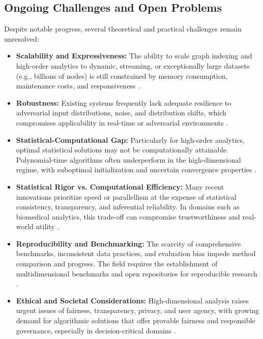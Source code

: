 \documentclass[sigconf]{acmart}
\begin{document}
\subsection{Ongoing Challenges and Open Problems}

Despite notable progress, several theoretical and practical challenges remain unresolved:

\begin{itemize}
    \item \textbf{Scalability and Expressiveness:} The ability to scale graph indexing and high-order analytics to dynamic, streaming, or exceptionally large datasets (e.g., billions of nodes) is still constrained by memory consumption, maintenance costs, and responsiveness \cite{ref104,ref107}.
    \item \textbf{Robustness:} Existing systems frequently lack adequate resilience to adversarial input distributions, noise, and distribution shifts, which compromises applicability in real-time or adversarial environments \cite{ref106}.
    \item \textbf{Statistical-Computational Gap:} Particularly for high-order analytics, optimal statistical solutions may not be computationally attainable. Polynomial-time algorithms often underperform in the high-dimensional regime, with suboptimal initialization and uncertain convergence properties \cite{ref110}.
    \item \textbf{Statistical Rigor vs. Computational Efficiency:} Many recent innovations prioritize speed or parallellism at the expense of statistical consistency, transparency, and inferential reliability. In domains such as biomedical analytics, this trade-off can compromise trustworthiness and real-world utility \cite{ref110,ref116}.
    \item \textbf{Reproducibility and Benchmarking:} The scarcity of comprehensive benchmarks, inconsistent data practices, and evaluation bias impede method comparison and progress. The field requires the establishment of multidimensional benchmarks and open repositories for reproducible research \cite{ref116}.
    \item \textbf{Ethical and Societal Considerations:} High-dimensional analysis raises urgent issues of fairness, transparency, privacy, and user agency, with growing demand for algorithmic solutions that offer provable fairness and responsible governance, especially in decision-critical domains \cite{ref117,ref118}.
\end{itemize}
\end{document}
